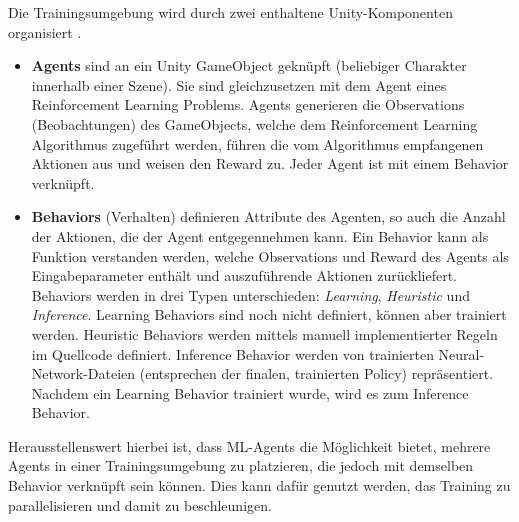 Die Trainingsumgebung wird durch zwei enthaltene Unity-Komponenten organisiert \cite{mlagentsOverview}.
\begin{itemize}
    \item \textbf{Agents} sind an ein Unity GameObject geknüpft (beliebiger Charakter innerhalb einer Szene).
    Sie sind gleichzusetzen mit dem Agent eines Reinforcement Learning Problems.
    Agents generieren die Observations (Beobachtungen) des GameObjects, welche dem Reinforcement Learning Algorithmus zugeführt werden, führen die vom Algorithmus empfangenen Aktionen aus und weisen den Reward zu.
    Jeder Agent ist mit einem Behavior verknüpft.

    \item \textbf{Behaviors} (Verhalten) definieren Attribute des Agenten, so auch die Anzahl der Aktionen, die der Agent entgegennehmen kann.
    Ein Behavior kann als Funktion verstanden werden, welche Observations und Reward des Agents als Eingabeparameter enthält und auszuführende Aktionen zurückliefert.
    Behaviors werden in drei Typen unterschieden: \emph{Learning}, \emph{Heuristic} und \emph{Inference}.
    Learning Behaviors sind noch nicht definiert, können aber trainiert werden.
    Heuristic Behaviors werden mittels manuell implementierter Regeln im Quellcode definiert.
    Inference Behavior werden von trainierten Neural-Network-Dateien (entsprechen der finalen, trainierten Policy) repräsentiert.
    Nachdem ein Learning Behavior trainiert wurde, wird es zum Inference Behavior.
\end{itemize}
Herausstellenswert hierbei ist, dass ML-Agents die Möglichkeit bietet, mehrere Agents in einer Trainingsumgebung zu platzieren, die jedoch mit demselben Behavior verknüpft sein können.
Dies kann dafür genutzt werden, das Training zu parallelisieren und damit zu beschleunigen.

